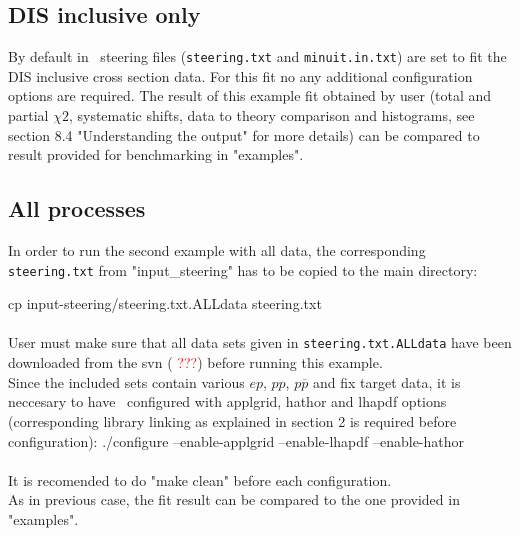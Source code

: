 \subsection{DIS inclusive only}
By default in \fitter\ steering files ({\tt steering.txt} and {\tt minuit.in.txt})
are set to fit the DIS inclusive cross section data. For this fit no any additional
configuration options are required.
The result of this example fit obtained by user (total and partial $\chi2$, systematic shifts, 
data to theory comparison and histograms, see section 8.4 "Understanding the output" for more details) 
can be compared to result provided for benchmarking in "examples".

\subsection{All processes}
In order to run the second example with all data, the corresponding
{\tt steering.txt} from "input\_steering" has to be copied to the main directory:

\goodbreak                 
cp input-steering/steering.txt.ALLdata steering.txt
\\ \\
User must make sure that all data sets given in {\tt steering.txt.ALLdata} 
have been downloaded from the svn (\textcolor{red}{ ???}) before running this example. 
\\
Since the included sets contain various $ep$, $pp$, $p \overline p$ and fix target
data, it is neccesary to have \fitter\ configured with applgrid, hathor and 
lhapdf options (corresponding library linking as explained in section 2 is
required before configuration): 
\goodbreak
./configure --enable-applgrid --enable-lhapdf --enable-hathor
\\ \\
It is recomended to do "make clean" before each configuration. \\        
As in previous case, the fit result can be compared to the one provided in "examples".



